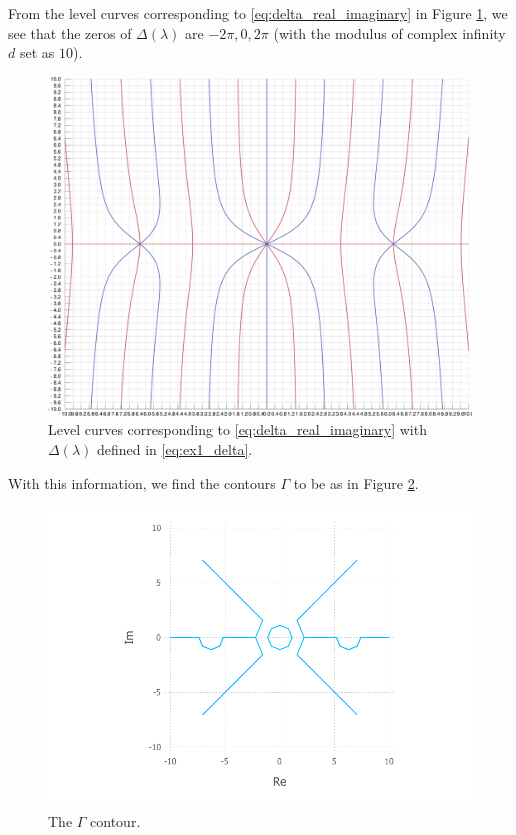 \documentclass[12pt, oneside, a4paper]{article}
\begin{document}
From the level curves corresponding to \eqref{eq:delta_real_imaginary} in Figure \ref{fig:ex1_levelCurves}, we see that the zeros of $\Delta(\lambda)$ are $-2\pi, 0, 2\pi$ (with the modulus of complex infinity $d$ set as $10$).
\begin{figure}[htpb!]
    \centering
    \includegraphics[width=1\linewidth]{ex1_levelCurves.pdf}
    \caption{Level curves corresponding to \eqref{eq:delta_real_imaginary} with $\Delta(\lambda)$ defined in \eqref{eq:ex1_delta}.}
    \label{fig:ex1_levelCurves}
\end{figure}
With this information, we find the contours $\Gamma$ to be as in Figure \ref{fig:ex1_contourPlot}.
\begin{figure}[htpb!]
    \centering
    \includegraphics[width=1\linewidth]{ex1_contourPlot.pdf}
    \caption{The $\Gamma$ contour.}
    \label{fig:ex1_contourPlot}
\end{figure}
\end{document}
